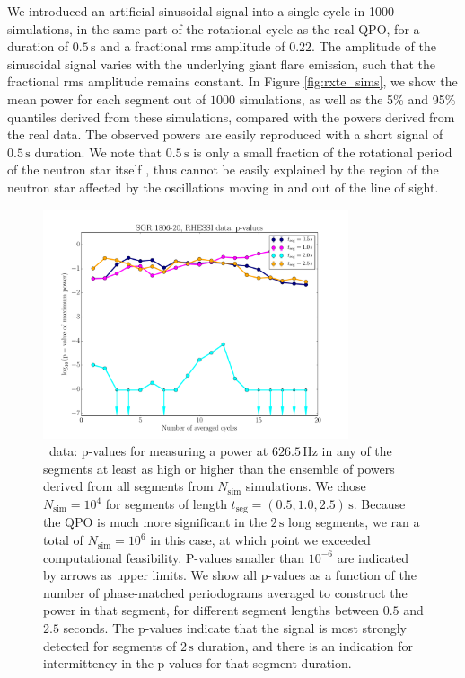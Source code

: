 \documentclass{emulateapj}
\begin{document}
We introduced an artificial sinusoidal signal into a single cycle in 1000 simulations, in the same part of the rotational cycle as the real QPO, for a duration of $0.5\, \mathrm{s}$ and a fractional rms amplitude of $0.22$. The amplitude of the sinusoidal signal varies with the underlying giant flare emission, such that the fractional rms amplitude remains constant. In Figure \ref{fig:rxte_sims}, we show the mean power for each segment out of $1000$ simulations, as well as the 5\% and 95\% quantiles derived from these simulations, compared with the powers derived from the real data. The observed powers are easily reproduced with a short signal of $0.5\, \mathrm{s}$ duration. We note that $0.5\,\mathrm{s}$ is only a small fraction of the rotational period of the neutron star itself \citep[$7.5477 \,\mathrm{s}$,][]{Woods07}, thus cannot be easily explained by the region of the neutron star affected by the oscillations moving in and out of the line of sight.
\begin{figure}[htbp]
\begin{center}
\includegraphics[width=9cm]{f7.pdf}
\caption{\rhessi\ data: p-values for measuring a power at $626.5\, \mathrm{Hz}$ in any of the segments at least as high or higher than the ensemble of powers derived from all segments from $N_{\mathrm{sim}}$ simulations. We chose $N_\mathrm{sim}=10^{4}$ for segments of length $t_{\mathrm{seg}} = (0.5, 1.0, 2.5) \,\mathrm{s}$. Because the QPO is much more significant in the $2\,\mathrm{s}$ long segments, we ran a total of $N_{\mathrm{sim}}=10^{6}$ in this case, at which point we exceeded computational feasibility. P-values smaller than $10^{-6}$ are indicated by arrows as upper limits. We show all p-values as a function of the number of phase-matched periodograms averaged to construct the power in that segment, for different segment lengths between $0.5$ and $2.5$ seconds. The p-values indicate that the signal is most strongly detected for segments of $2\,\mathrm{s}$ duration, and there is an indication for intermittency in the p-values for that segment duration.}
\label{fig:rhessi_pvalues}
\end{center}
\end{figure}
\end{document}
